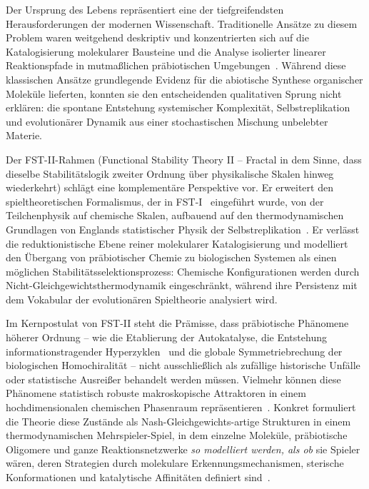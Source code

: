 \documentclass[12pt,a4paper]{article}
\theoremstyle{remark}
\begin{document}
Der Ursprung des Lebens repräsentiert eine der tiefgreifendsten Herausforderungen der modernen Wissenschaft. Traditionelle Ansätze zu diesem Problem waren weitgehend deskriptiv und konzentrierten sich auf die Katalogisierung molekularer Bausteine und die Analyse isolierter linearer Reaktionspfade in mutmaßlichen präbiotischen Umgebungen~\citep{MillerUrey}. Während diese klassischen Ansätze grundlegende Evidenz für die abiotische Synthese organischer Moleküle lieferten, konnten sie den entscheidenden qualitativen Sprung nicht erklären: die spontane Entstehung systemischer Komplexität, Selbstreplikation und evolutionärer Dynamik aus einer stochastischen Mischung unbelebter Materie.

Der FST-II-Rahmen (Functional Stability Theory II -- \glqq Fractal\grqq{} in dem Sinne, dass dieselbe Stabilitätslogik zweiter Ordnung über physikalische Skalen hinweg wiederkehrt) schlägt eine komplementäre Perspektive vor. Er erweitert den spieltheoretischen Formalismus, der in FST-I~\citep{FSTI} eingeführt wurde, von der Teilchenphysik auf chemische Skalen, aufbauend auf den thermodynamischen Grundlagen von Englands statistischer Physik der Selbstreplikation~\citep{England2013}. Er verlässt die reduktionistische Ebene reiner molekularer Katalogisierung und modelliert den Übergang von präbiotischer Chemie zu biologischen Systemen als einen möglichen Stabilitätsselektionsprozess: Chemische Konfigurationen werden durch Nicht-Gleichgewichtsthermodynamik eingeschränkt, während ihre Persistenz mit dem Vokabular der evolutionären Spieltheorie analysiert wird.

Im Kernpostulat von FST-II steht die Prämisse, dass präbiotische Phänomene höherer Ordnung -- wie die Etablierung der Autokatalyse, die Entstehung informationstragender Hyperzyklen~\citep{Eigen1979} und die globale Symmetriebrechung der biologischen Homochiralität -- nicht ausschließlich als zufällige historische Unfälle oder statistische Ausreißer behandelt werden müssen. Vielmehr können diese Phänomene statistisch robuste makroskopische Attraktoren in einem hochdimensionalen chemischen Phasenraum repräsentieren~\citep{ReplicatorEntropy}. Konkret formuliert die Theorie diese Zustände als Nash-Gleichgewichts-artige Strukturen in einem thermodynamischen Mehrspieler-Spiel, in dem einzelne Moleküle, präbiotische Oligomere und ganze Reaktionsnetzwerke \emph{so modelliert werden, als ob} sie \glqq Spieler\grqq{} wären, deren \glqq Strategien\grqq{} durch molekulare Erkennungsmechanismen, sterische Konformationen und katalytische Affinitäten definiert sind~\citep{CGT2018,CGTMacmillan}.
\end{document}

